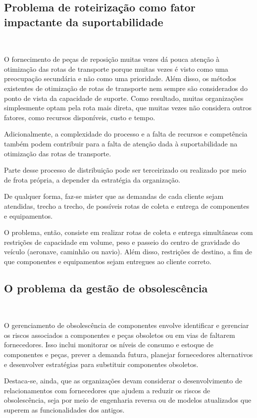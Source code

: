 \documentclass{amsart}
\begin{document}
\subsection{Problema de roteirização como fator impactante da suportabilidade}\

O fornecimento de peças de reposição muitas vezes dá pouca atenção à otimização das rotas de transporte porque muitas vezes é visto como uma preocupação secundária e não como uma prioridade.
Além disso, os métodos existentes de otimização de rotas de transporte nem sempre são considerados do ponto de vista da capacidade de suporte. Como resultado, muitas organizações simplesmente optam pela rota mais direta, que muitas vezes não considera outros fatores, como recursos disponíveis, custo e tempo.

Adicionalmente, a complexidade do processo e a falta de recursos e competência também podem contribuir para a falta de atenção dada à suportabilidade na otimização das rotas de transporte.

Parte desse processo de distribuição pode ser terceirizado ou realizado por meio de frota própria, a depender da estratégia da organização.

De qualquer forma, faz-se mister que as demandas de cada cliente sejam atendidas, trecho a trecho, de possíveis rotas de coleta e entrega de componentes e equipamentos.

O problema, então, consiste em realizar rotas de coleta e entrega simultâneas com restrições de capacidade em volume,  peso e passeio do centro de gravidade do veículo (aeronave, caminhão ou navio). Além disso, restrições de destino, a fim de que componentes e equipamentos sejam entregues ao cliente correto.


\subsection{O problema da gestão de obsolescência}\

O gerenciamento de obsolescência de componentes envolve identificar e gerenciar os riscos associados a componentes e peças obsoletos ou em vias de faltarem fornecedores. Isso inclui monitorar os níveis de consumo e estoque de componentes e peças, prever a demanda futura, planejar fornecedores alternativos e desenvolver estratégias para substituir componentes obsoletos.

Destaca-se, ainda, que as organizações devam considerar o desenvolvimento de relacionamentos com fornecedores que ajudem a reduzir os riscos de obsolescência, seja por meio de engenharia reversa ou de modelos atualizados que superem as funcionalidades dos antigos.
\end{document}
